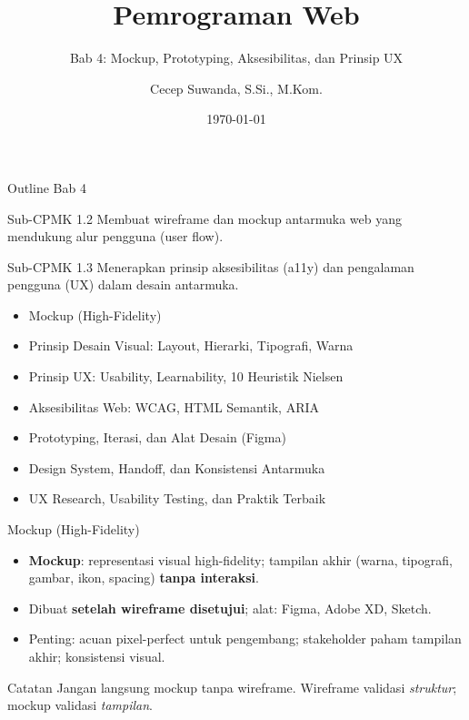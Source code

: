 \documentclass[handout]{beamer}
\title[Bab 4 -- Mockup \& UX]{Pemrograman Web}
\subtitle{Bab 4: Mockup, Prototyping, Aksesibilitas, dan Prinsip UX}
\author{Cecep Suwanda, S.Si., M.Kom.}
\institute{Universitas Bale Bandung}
\date{\today}
\begin{document}
\begin{frame}
	\titlepage
\end{frame}

\begin{frame}[shrink=15]{Outline Bab 4}
	\begin{block}{Sub-CPMK 1.2}
		Membuat wireframe dan mockup antarmuka web yang mendukung alur pengguna (user flow).
	\end{block}
	\begin{block}{Sub-CPMK 1.3}
		Menerapkan prinsip aksesibilitas (a11y) dan pengalaman pengguna (UX) dalam desain antarmuka.
	\end{block}
	\begin{itemize}
		\item Mockup (High-Fidelity)
		\item Prinsip Desain Visual: Layout, Hierarki, Tipografi, Warna
		\item Prinsip UX: Usability, Learnability, 10 Heuristik Nielsen
		\item Aksesibilitas Web: WCAG, HTML Semantik, ARIA
		\item Prototyping, Iterasi, dan Alat Desain (Figma)
		\item Design System, Handoff, dan Konsistensi Antarmuka
		\item UX Research, Usability Testing, dan Praktik Terbaik
	\end{itemize}
\end{frame}

\begin{frame}{Mockup (High-Fidelity)}
	\begin{itemize}
		\item \textbf{Mockup}: representasi visual high-fidelity; tampilan akhir (warna, tipografi, gambar, ikon, spacing) \textbf{tanpa interaksi}.
		\item Dibuat \textbf{setelah wireframe disetujui}; alat: Figma, Adobe XD, Sketch.
		\item Penting: acuan pixel-perfect untuk pengembang; stakeholder paham tampilan akhir; konsistensi visual.
	\end{itemize}
	\begin{block}{Catatan}
		Jangan langsung mockup tanpa wireframe. Wireframe validasi \textit{struktur}; mockup validasi \textit{tampilan}.
	\end{block}
\end{frame}
\end{document}
